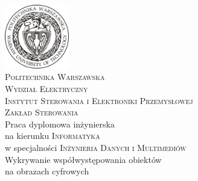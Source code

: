\documentclass[a4paper,11pt, notitlepage, twoside, openany ]{report}
\begin{document}
	
	\begin{titlepage}
		
		\newcommand{\HRule}{\rule{\linewidth}{0.5mm}} %
		
		\center %
		
		\includegraphics[width = 28mm]{logo.jpg}\\[1.0cm] %

		
		\textsc{\LARGE Politechnika Warszawska}\\[0.5cm] %
		\textsc{\Large Wydział Elektryczny }\\[1.0cm] %
		\textsc{ Instytut Sterowania i Elektroniki Przemysłowej \\
		Zakład Sterowania}\\[1.5cm] %

		
		
		{ 	\fontsize{35}{30}\selectfont Praca dyplomowa inżynierska }\\[0.5cm] %
		
		na kierunku \textsc{Informatyka} \\
		w specjalności \textsc{Inżynieria Danych i Multimediów}\\[1.0cm] 

		\LARGE Wykrywanie współwystępowania obiektów\\ na obrazach cyfrowych \\[2.0cm] 
		

\end{titlepage}
\end{document}
